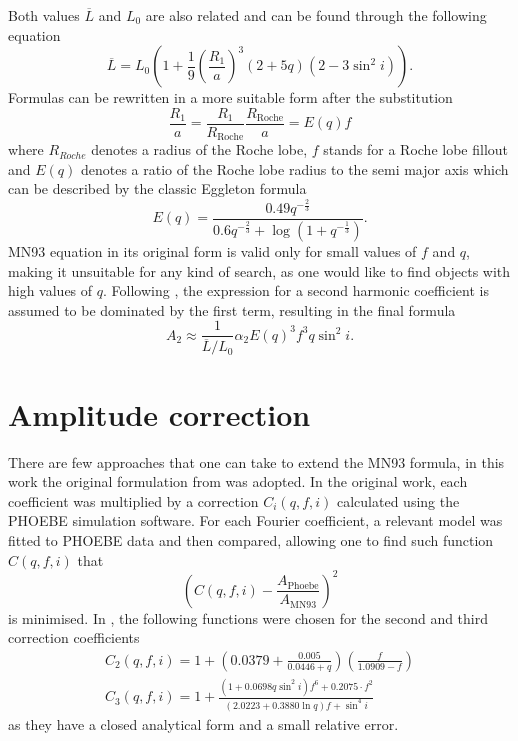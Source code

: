 \documentclass{pracalicmgr}
\begin{document}
Both values $\overline{L}$ and $L_0$ are also related and can be found through the following equation
\begin{equation}
    \overline{L}=L_0\left(1+\frac{1}{9}\left(\frac{R_1}{a}\right)^3(2+5q)(2-3\sin^2{i})\right).
\end{equation}
Formulas can be rewritten in a more suitable form after the substitution
\begin{equation}
    \frac{R_1}{a}=\frac{R_1}{R_{\textrm{Roche}}}\frac{R_{\textrm{Roche}}}{a}=E(q)f
\end{equation}
where $R_{Roche}$ 
denotes a radius of the Roche lobe, $f$ stands for a Roche lobe fillout and $E(q)$ denotes a ratio of the Roche lobe radius to the semi major axis which can be described by the classic Eggleton formula 
\citep{eggleton_approximations_1983}
\begin{equation}
    E(q)=\frac{0.49q^{-\frac{2}{3}}}{0.6q^{-\frac{2}{3}}+\log{(1+q^{-\frac{1}{3}})}}.
\end{equation}
MN93 equation in its original form is valid only for small values of $f$ and $q$, making it unsuitable for any kind of search, as one would like to find objects with high values of $q$.
Following \citet{gomel_search_2021-1}, the expression for a second harmonic coefficient is assumed to be dominated by the first term, resulting in the final formula 
\begin{equation}
    A_2\approx \frac{1}{\overline{L}/L_0} \alpha_2 E(q)^3 f^3 q \sin^2{i}.
\end{equation}
\section{Amplitude correction}
There are few approaches that one can take to extend the MN93 formula, in this work the original formulation from \citet{gomel_search_2021-1} was adopted.
In the original work, each coefficient was multiplied by a correction $C_i(q,f,i)$ calculated using the PHOEBE simulation software. For each
Fourier coefficient, a relevant model was fitted to PHOEBE data and then compared, allowing one to find such function $C(q,f,i)$ that 
\begin{equation}
    \left(C(q,f,i)-\frac{A_{\textrm{Phoebe}}}{A_{\textrm{MN93}}}\right)^2
\end{equation}
is minimised. In \citet{gomel_search_2021-1}, the following functions were chosen for the second and third correction coefficients
\begin{align}
    C_2(q,f,i)=1+\left(0.0379+\frac{0.005}{0.0446+q}\right)\left(\frac{f}{1.0909-f}\right)\\
    C_3(q,f,i)=1+\frac{(1+0.0698q\sin^2{i})f^6+0.2075\cdot f^2}{(2.0223+0.3880\ln{q})f+\sin^4{i}}
\end{align}
as they have a closed analytical form and a small relative error. 
\end{document}
